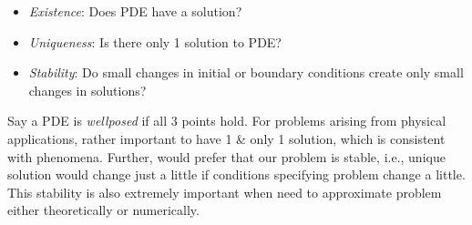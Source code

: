 \documentclass{article}
\begin{document}
\begin{enumerate}
\begin{itemize}
\begin{itemize}
			\begin{itemize}
				\item {\it Existence}: Does PDE have a solution?
				\item {\it Uniqueness}: Is there only 1 solution to PDE?
				\item {\it Stability}: Do small changes in initial or boundary conditions create only small changes in solutions?
			\end{itemize}
			Say a PDE is {\it wellposed} if all 3 points hold. For problems arising from physical applications, rather important to have 1 \& only 1 solution, which is consistent with phenomena. Further, would prefer that our problem is stable, i.e., unique solution would change just a little if conditions specifying problem change a little. This stability is also extremely important when need to approximate problem either theoretically or numerically.
			

\end{itemize}
\end{itemize}
\end{enumerate}
\end{document}
